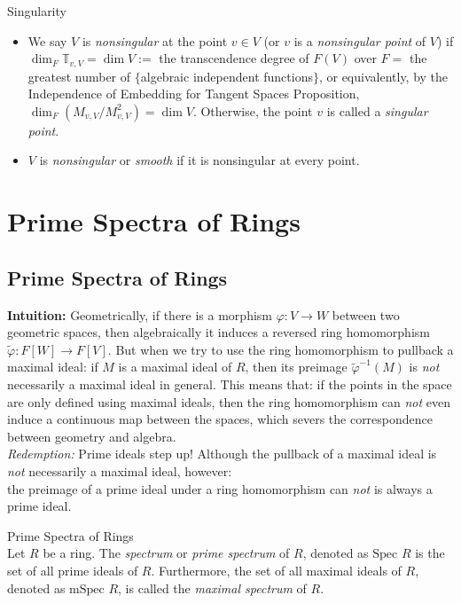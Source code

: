 \begin{definition}{Singularity}
    \begin{itemize}
        \item We say $V$ is \textit{nonsingular} at the point $v \in V$ (or $v$ is a \textit{nonsingular point} of $V$) if $\dim_F \mathbb{T}_{v,V}= \dim V:=$ the transcendence degree of $F(V)$ over $F=$ the greatest number of $\{$algebraic independent functions$\}$, or equivalently, by the Independence of Embedding for Tangent Spaces Proposition, $\dim_F (M_{v,V}/ M_{v,V}^2) =\dim V$. Otherwise, the point $v$ is called a \textit{singular point}.

        \item $V$ is \textit{nonsingular} or \textit{smooth} if it is nonsingular at every point.
    \end{itemize}
\end{definition}

\section{Prime Spectra of Rings}

\subsection{Prime Spectra of Rings}

\noindent\textbf{Intuition:} Geometrically, if there is a morphism $\varphi: V\to W$ between two geometric spaces, then algebraically it induces a reversed ring homomorphism $\widetilde{\varphi} :F[W] \to F[V]$. But when we try to use the ring homomorphism to pullback a maximal ideal: if $M$ is a maximal ideal of $R$, then its preimage $\widetilde{\varphi}^{-1} (M)$ is \textit{not} necessarily a maximal ideal in general. This means that: if the points in the space are only defined using maximal ideals, then the ring homomorphism can \textit{not} even induce a continuous map between the spaces, which severs the correspondence between geometry and algebra.\\
\textit{Redemption:} Prime ideals step up! Although the pullback of a maximal ideal is \textit{not} necessarily a maximal ideal, however:\\
the preimage of a prime ideal under a ring homomorphism can \textit{not} is always a prime ideal.

\begin{definition}{Prime Spectra of Rings}\\
Let $R$ be a ring. The \textit{spectrum} or \textit{prime spectrum} of $R$, denoted as $\text{Spec }R$ is the set of all prime ideals of $R$. Furthermore, the set of all maximal ideals of $R$, denoted as $\text{mSpec }R$, is called the \textit{maximal spectrum} of $R$.
\end{definition}

